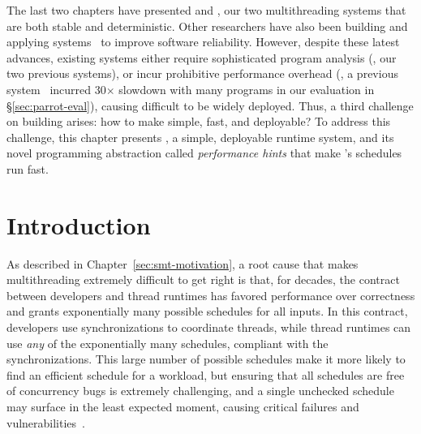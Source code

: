 The last two chapters have presented \tern and \peregrine, our two 
multithreading systems that are both stable and deterministic. Other 
researchers have also been building and applying \smt 
systems~\cite{determinator:osdi10, dthreads:sosp11, bergan:oopsla13} to improve 
software reliability. However, despite these latest advances, existing \smt 
systems either require sophisticated program analysis (\eg, our two previous 
systems), or incur prohibitive performance overhead (\eg, a previous 
system~\cite{dthreads:sosp11} incurred 30$\times$ slowdown with many programs 
in our evaluation in \S\ref{sec:parrot-eval}), causing \smt difficult to be 
widely deployed. Thus, a third challenge on building \smt arises: how to make 
\smt simple, fast, and deployable? To address this challenge, this chapter 
presents \parrot, a simple, deployable \smt runtime system, and its 
novel programming abstraction called \emph{performance hints} that make 
\parrot's schedules run fast.

\section{Introduction} \label{sec:parrot-intro}

As described in Chapter~\ref{sec:smt-motivation}, a root cause that makes 
multithreading extremely difficult to get right
is that, for decades, the contract between developers and thread runtimes has 
favored performance over correctness and grants exponentially many possible 
schedules for all inputs.  In this contract, developers use 
synchronizations to coordinate threads, while thread runtimes can
use \emph{any} of the exponentially many schedules, 
compliant with the synchronizations.  This large number of possible schedules 
make it more likely to find an efficient schedule for a workload, but ensuring
that all schedules are free of concurrency bugs is extremely challenging, and a 
single unchecked schedule may surface in the least expected moment, causing 
critical failures and vulnerabilities~\cite{therac25-investigation, 
northeast-blackout, lu:concurrency-bugs,con:hotpar12}.

